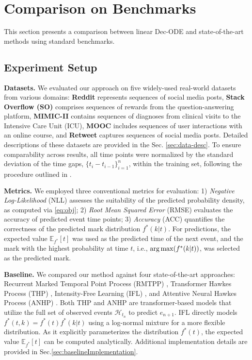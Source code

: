 
\section{Comparison on Benchmarks}
This section presents a comparison between linear Dec-ODE and state-of-the-art methods using standard benchmarks.

\subsection{Experiment Setup \label{sec:experimentSetup}}
\label{sec:setup}

\textbf{Datasets.}  
We evaluated our approach on five widely-used real-world datasets from various domains:  
{\bf Reddit} represents sequences of social media posts,  
{\bf Stack Overflow (SO)} comprises sequences of rewards from the question-answering platform,  
{\bf MIMIC-II} contains sequences of diagnoses from clinical visits to the Intensive Care Unit (ICU),  
{\bf MOOC} includes sequences of user interactions with an online course,  
and {\bf Retweet} captures sequences of social media posts. Detailed descriptions of these datasets are provided in the Sec. \ref{sec:data-desc}.  
To ensure comparability across results, all time points were normalized by the standard deviation of the time gaps, $\{t_i - t_{i-1}\}_{i=1}^n$, within the training set, following the procedure outlined in \cite{bib:MetaTPP}.  

\textbf{Metrics.}  
We employed three conventional metrics for evaluation:  
1) \textit{Negative Log-Likelihood} (NLL) assesses the suitability of the predicted probability density, as computed via \eqref{eq:obj};  
2) \textit{Root Mean Squared Error} (RMSE) evaluates the accuracy of predicted event time points;  
3) \textit{Accuracy} (ACC) quantifies the correctness of the predicted mark distribution $f^*(k|t)$.  
For predictions, the expected value $\mathbb{E}_{f^*}[t]$ was used as the predicted time of the next event, and the mark with the highest probability at time $t$, i.e., $\argmax(f^*(k|t))$, was selected as the predicted mark.  

\textbf{Baseline.}  
We compared our method against four state-of-the-art approaches:  
Recurrent Marked Temporal Point Process (RMTPP) \cite{bib:RMTPP}, Transformer Hawkes Process (THP) \cite{bib:THP}, Intensity-Free Learning (IFL) \cite{bib:ifl}, and Attentive Neural Hawkes Process (ANHP) \cite{bib:ANHP}.  
Both THP and ANHP are transformer-based models that utilize the full set of observed events $\mathcal{H}_{t_n}$ to predict $e_{n+1}$.  
IFL directly models $f^*(t,k) = f^*(t) f^*(k|t)$ using a log-normal mixture for a more flexible distribution.  
As it explicitly parameterizes the distribution $f^*(t)$, the expected value $\mathbb{E}_{f^*}[t]$ can be computed analytically.  
Additional implementation details are provided in Sec.\ref{sec:baselineImplementation}.


